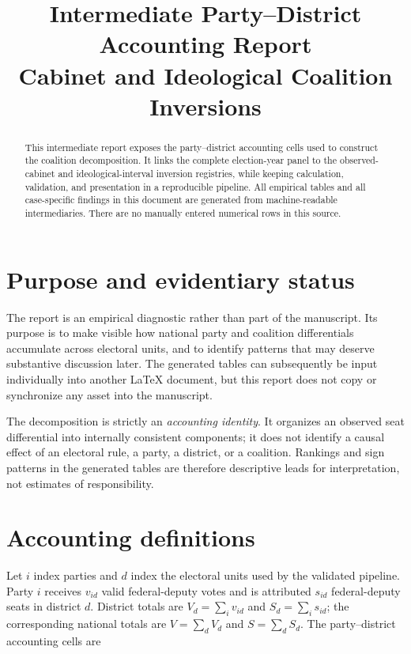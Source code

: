 \documentclass[11pt]{article}
\title{Intermediate Party--District Accounting Report\\
Cabinet and Ideological Coalition Inversions}
\author{}
\date{}
\begin{document}
\maketitle

\begin{abstract}
This intermediate report exposes the party--district accounting cells used to
construct the coalition decomposition. It links the complete election-year
panel to the observed-cabinet and ideological-interval inversion registries,
while keeping calculation, validation, and presentation in a reproducible
pipeline. All empirical tables and all case-specific findings in this document
are generated from machine-readable intermediaries. There are no manually
entered numerical rows in this source.
\end{abstract}

\tableofcontents

\section{Purpose and evidentiary status}

The report is an empirical diagnostic rather than part of the manuscript. Its
purpose is to make visible how national party and coalition differentials
accumulate across electoral units, and to identify patterns that may deserve
substantive discussion later. The generated tables can subsequently be input
individually into another \LaTeX{} document, but this report does not copy or
synchronize any asset into the manuscript.

The decomposition is strictly an \emph{accounting identity}. It organizes an
observed seat differential into internally consistent components; it does not
identify a causal effect of an electoral rule, a party, a district, or a
coalition. Rankings and sign patterns in the generated tables are therefore
descriptive leads for interpretation, not estimates of responsibility.

\section{Accounting definitions}

Let $i$ index parties and $d$ index the electoral units used by the validated
pipeline. Party $i$ receives $v_{id}$ valid federal-deputy votes and is
attributed $s_{id}$ federal-deputy seats in district $d$. District totals are
$V_d=\sum_i v_{id}$ and $S_d=\sum_i s_{id}$; the corresponding national totals
are $V=\sum_d V_d$ and $S=\sum_d S_d$. The party--district accounting cells are
\end{document}
